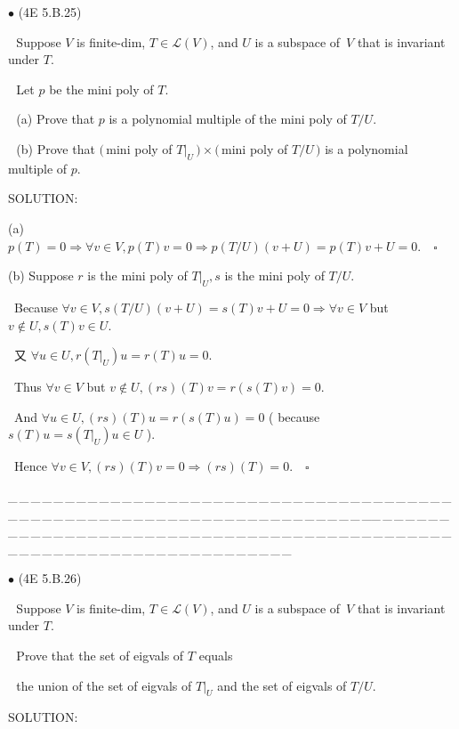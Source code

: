 \documentclass[a4paper, 11pt, UTF8]{article}
\def\Lm{\mathcal{L}}
\begin{document}
\begin{large}
{\small $\bullet$} (\normalsize{4E 5.B.25})\par\,\, {\timessl\Large 
Suppose $V$ is finite-dim, $T\in \Lm(V)$, and $U$ is a subspace of \,$V$ that is invariant under $T$.}\par\,\,
{\timessl\Large
Let $p$ be the mini poly of $T.$
}\par\,\,
(a) {\timessl\Large Prove that $p$ is a polynomial multiple of the mini poly of $T/U$.}\par\,\,
(b) {\timessl\Large Prove that
$(\,$mini poly of $T|_U\,) \times (\,$mini poly of $T/U\,)$ is a polynomial multiple of $p$.
}\par
{\timesbf S\footnotesize{OLUTION:}}\par\quad
(a) $p(T)=0\Rightarrow\forall v\in V,p(T)v=0\Rightarrow p(T/U)(v+U)=p(T)v+U=0.\quad\square$\par\quad
(b) Suppose $r$ is the mini poly of $T|_U,s$ is the mini poly of $T/U.$\par\qquad\,
Because $\forall v\in V,s(T/U)(v+U)=s(T)v+U=0\Rightarrow \forall v\in V$ but $v\not\in U,s(T)v\in U.$\par\qquad\,
又 $\forall u\in U,r(T|_U)u=r(T)u=0.$\par\qquad\,
Thus $\forall v\in V$ but $v\not\in U,(rs)(T)v=r(s(T)v)=0.$\par\qquad\,
And $\forall u\in U,(rs)(T)u=r(s(T)u)=0$ ( because $s(T)u=s(T|_U)u\in U$ ).\par\qquad\,
Hence $\forall v\in V, (rs)(T)v=0\Rightarrow (rs)(T)=0.\quad\square$
\par
{\tiny \_\,\_\,\_\,\_\,\_\,\_\,\_\,\_\,\_\,\_\,\_\,\_\,\_\,\_\,\_\,\_\,\_\,\_\,\_\,\_\,\_\,\_\,\_\,\_\,\_\,\_\,\_\,\_\,\_\,\_\,\_\,\_\,\_\,\_\,\_\,\_\,\_\,\_\,\_\,\_\,\_\,\_\,\_\,\_\,\_\,\_\,\_\,\_\,\_\,\_\,\_\,\_\,\_\,\_\,\_\,\_\,\_\,\_\,\_\,\_\,\_\,\_\,\_\,\_\,\_\,\_\,\_\,\_\,\_\,\_\,\_\_\,\_\,\_\,\_\,\_\,\_\,\_\,\_\,\_\,\_\,\_\,\_\,\_\,\_\,\_\,\_\,\_\,\_\,\_\,\_\,\_\,\_\,\_\,\_\,\_\,\_\,\_\,\_\,\_\,\_\,\_\,\_\,\_\,\_\,\_\,\_\,\_\,\_\,\_\,\_\,\_\,\_\,\_\,\_\,\_\,\_\,\_\,\_\,\_\,\_\,\_\,\_\,\_\,\_\,\_\,\_\,\_\,\_\,\_\,\_\,\_\,\_\,\_\,\_\,\_\,\_\,\_\,\_\,\_\,\_\,\_}\par

{\small $\bullet$} (\normalsize{4E 5.B.26})\par\,\, {\timessl\Large 
Suppose $V$ is finite-dim, $T\in \Lm(V)$, and $U$ is a subspace of \,$V$ that is invariant under $T$.}\par\,\,
{\timessl\Large Prove that the set of eigvals of $T$ equals}\par\,\,
{\timessl\Large the union of the set of eigvals of $T|_U$ and the set of eigvals of $T/U$.
}\par
{\timesbf S\footnotesize{OLUTION:}}\par\quad


\end{large}
\end{document}
